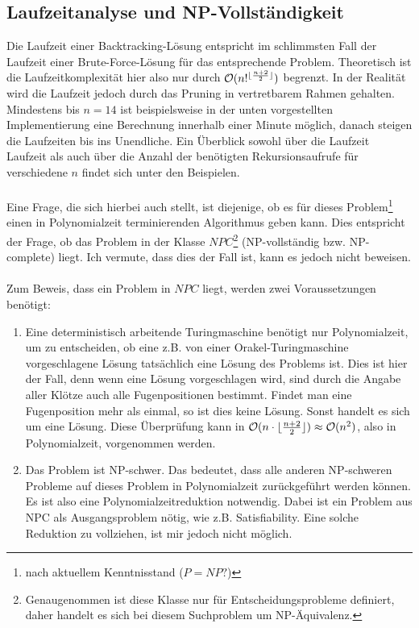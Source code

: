 \documentclass[a4paper, notitlepage, 12pt]{scrartcl}
\DeclarePairedDelimiter\floor{\lfloor}{\rfloor}
\begin{document}
\subsection{Laufzeitanalyse und NP-Vollständigkeit}
Die Laufzeit einer Backtracking-Lösung entspricht im schlimmsten Fall der Laufzeit einer Brute-Force-Lösung für das entsprechende Problem. Theoretisch ist die Laufzeitkomplexität hier also nur durch $\mathcal{O}(n!^{\floor{\frac{n + 2}{2}}})$ begrenzt. In der Realität wird die Laufzeit jedoch durch das Pruning in vertretbarem Rahmen gehalten. Mindestens bis $n = 14$ ist beispielsweise in der unten vorgestellten Implementierung eine Berechnung innerhalb einer Minute möglich, danach steigen die Laufzeiten bis ins Unendliche. Ein Überblick sowohl über die Laufzeit Laufzeit als auch über die Anzahl der benötigten Rekursionsaufrufe für verschiedene $n$ findet sich unter den Beispielen. \\ \\
Eine Frage, die sich hierbei auch stellt, ist diejenige, ob es für dieses Problem\footnote{nach aktuellem Kenntnisstand ($P = NP ?$)} einen in Polynomialzeit terminierenden Algorithmus geben kann. Dies entspricht der Frage, ob das Problem in der Klasse $NPC$\footnote{Genaugenommen ist diese Klasse nur für Entscheidungsprobleme definiert, daher handelt es sich bei diesem Suchproblem um NP-Äquivalenz.} (NP-vollständig bzw. NP-complete) liegt. Ich vermute, dass dies der Fall ist, kann es jedoch nicht beweisen. \\ \\
Zum Beweis, dass ein Problem in $NPC$ liegt, werden zwei Voraussetzungen benötigt:
\begin{enumerate}
\item Eine deterministisch arbeitende Turingmaschine benötigt nur Polynomialzeit, um zu entscheiden, ob eine z.B. von einer Orakel-Turingmaschine vorgeschlagene Lösung tatsächlich eine Lösung des Problems ist. Dies ist hier der Fall, denn wenn eine Lösung vorgeschlagen wird, sind durch die Angabe aller Klötze auch alle Fugenpositionen bestimmt. Findet man eine Fugenposition mehr als einmal, so ist dies keine Lösung. Sonst handelt es sich um eine Lösung. Diese Überprüfung kann in $\mathcal{O}(n \cdot \floor{\frac{n + 2}{2}}) \approx \mathcal{O}(n^2)$, also in Polynomialzeit, vorgenommen werden.
\item Das Problem ist NP-schwer. Das bedeutet, dass alle anderen NP-schweren Probleme auf dieses Problem in Polynomialzeit zurückgeführt werden können. Es ist also eine Polynomialzeitreduktion notwendig. Dabei ist ein Problem aus NPC als Ausgangsproblem nötig, wie z.B. Satisfiability. Eine solche Reduktion zu vollziehen, ist mir jedoch nicht möglich.
\end{enumerate}
\end{document}
